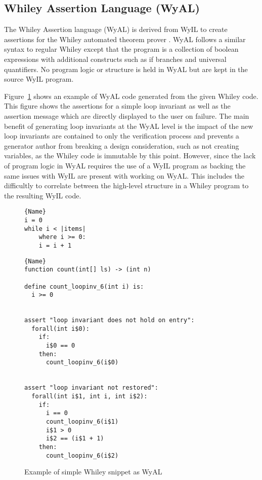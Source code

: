 \subsection{Whiley Assertion Language (WyAL)}

The Whiley Assertion language (WyAL) is derived from WyIL to create
assertions for the Whiley automated theorem prover \cite{wyal}.
WyAL follows a similar syntax to regular Whiley except that the program
is a collection of boolean expressions with additional constructs such as
if branches and universal quantifiers.
No program logic or structure is held in WyAL but are kept in the source
WyIL program.

Figure~\ref{lst:design-wyal} shows an example of WyAL code generated from
the given Whiley code.
This figure shows the assertions for a simple loop invariant as well as the
assertion message which are directly displayed to the user on failure.
The main benefit of generating loop invariants at the WyAL level is the
impact of the new loop invariants are contained to only the verification
process and prevents a generator author from breaking a design consideration,
such as not creating variables, as the Whiley code is immutable by this point.
However, since the lack of program logic in WyAL requires the use of a WyIL program
as backing the same issues with WyIL are present with working on WyAL.
This includes the difficultly to correlate between the high-level structure
in a Whiley program to the resulting WyIL code.

\begin{figure}
\noindent\begin{minipage}{.45\textwidth}
\begin{lstlisting}[caption={Whiley Code},frame=tlrb,numbers=none]{Name}
i = 0
while i < |items|
    where i >= 0:
    i = i + 1
\end{lstlisting}
\end{minipage}\hfill
\begin{minipage}{.45\textwidth}
\begin{lstlisting}[caption={WyAL Code},frame=tlrb,numbers=none,breaklines=true]{Name}
function count(int[] ls) -> (int n)

define count_loopinv_6(int i) is:
  i >= 0


assert "loop invariant does not hold on entry":
  forall(int i$0):
    if:
      i$0 == 0
    then:
      count_loopinv_6(i$0)


assert "loop invariant not restored":
  forall(int i$1, int i, int i$2):
    if:
      i == 0
      count_loopinv_6(i$1)
      i$1 > 0
      i$2 == (i$1 + 1)
    then:
      count_loopinv_6(i$2)
\end{lstlisting}
\end{minipage}
    \caption{Example of simple Whiley snippet as WyAL}
    \label{lst:design-wyal}
\end{figure}

